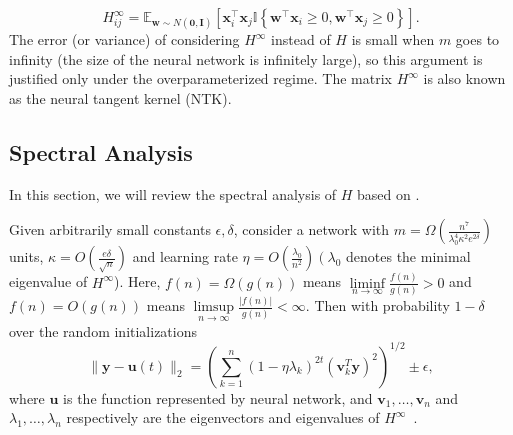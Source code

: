 \documentclass[letterpaper,12pt]{article}
\begin{document}
\begin{equation}\label{eq:H infinity}
H_{i j}^{\infty}=\mathbb{E}_{\mathbf{w} \sim N(\mathbf{0}, \mathbf{I})}\left[\mathbf{x}_{i}^{\top} \mathbf{x}_{j} \mathbb{I}\left\{\mathbf{w}^{\top} \mathbf{x}_{i} \geq 0, \mathbf{w}^{\top} \mathbf{x}_{j} \geq 0\right\}\right].
\end{equation}
The error (or variance) of considering $H^\infty$ instead of $H$ is small when $m$ goes to infinity (the size of the neural network is infinitely large), so this argument is justified only under the overparameterized regime. The matrix ${H}^{\infty}$ is also known as the neural tangent kernel (NTK).



\subsection{Spectral Analysis}
In this section, we will review the spectral analysis of $H$ based on \cite{basri2019convergence}. 

Given arbitrarily small constants $\epsilon, \delta$, consider a network with $m=\Omega\left(\frac{n^{7}}{\lambda_{0}^{4} \kappa^{2} e^{2 \delta}}\right)$ units, $\kappa=O\left(\frac{e \delta}{\sqrt{n}}\right)$ and learning rate $\eta=O\left(\frac{\lambda_{0}}{n^{2}}\right)\left(\lambda_{0}\right.$
denotes the minimal eigenvalue of $H^{\infty}$). Here, $f(n)=\Omega(g(n))$ means $\liminf\limits_{n \rightarrow \infty} \frac{f(n)}{g(n)}>0$ and $f(n)=O(g(n))$ means $\limsup\limits_{n \rightarrow \infty} \frac{|f(n)|}{g(n)}<\infty$. Then with probability $1-\delta$ over the random initializations
\begin{equation}
\|\mathbf{y}-\mathbf{u}(t)\|_{2}=\left(\sum_{k=1}^{n}\left(1-\eta \lambda_{k}\right)^{2 t}\left(\mathbf{v}_{k}^{T} \mathbf{y}\right)^{2}\right)^{1 / 2} \pm \epsilon,
\end{equation}
where $\mathbf{u}$ is the function represented by neural network, and $\mathbf{v}_{1}, \ldots, \mathbf{v}_{n}$ and $\lambda_{1}, \ldots, \lambda_{n}$ respectively are the eigenvectors and eigenvalues of $H^{\infty}$~\cite[section 4.1]{basri2019convergence}.
\end{document}
